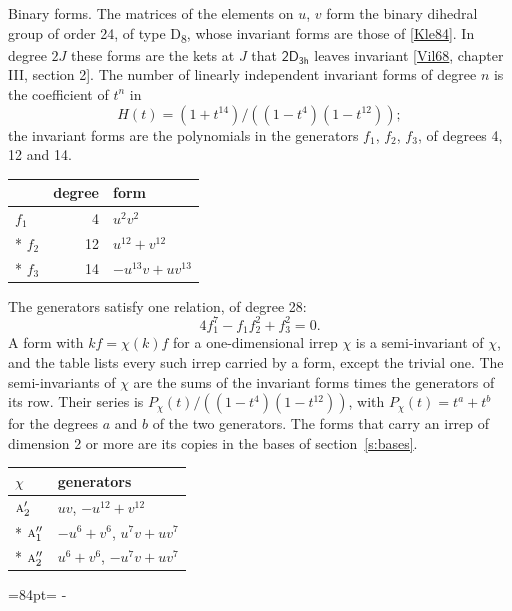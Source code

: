 \documentclass[10pt,a4paper]{article}
\makeatletter
\renewcommand\paragraph{\@startsection{paragraph}{4}{\z@}{1.5ex plus .5ex minus .2ex}{-1em}%
  {\normalfont\small\sffamily\bfseries\color{parttitle}}}
\newcommand{\needspace}[1]{\par\penalty-100\begingroup\dimen0=#1\relax\dimen2=\pagegoal
  \advance\dimen2-\pagetotal\ifdim\dimen0>\dimen2\relax\ifdim\dimen2>0pt\vfil\break\fi\fi
  \endgroup}
\numberwithin{equation}{section}
\newcommand{\grp}[1]{\mathsf{#1}}
\newcommand{\irr}[1]{\text{\normalfont\scshape #1}}
\makeatother
\begin{document}
\paragraph{Binary forms.}
The matrices of the elements on $u$, $v$ form the binary dihedral group of order 24, of type D\textsubscript{8}, whose invariant forms are those of [\href{../../../REFERENCES.pdf\#ref.Kle84}{Kle84}]. In degree $2J$ these forms are the kets at $J$ that $\grp{2D_{3h}}$ leaves invariant [\href{../../../REFERENCES.pdf\#ref.Vil68}{Vil68}, chapter III, section 2]. \label{n:head.degree}\label{n:head.form}The number of linearly independent invariant forms of degree $n$ is the coefficient of $t^n$ in
\begin{equation}\label{e:molien}H(t) = (1 + t^{14})/((1-t^{4})(1-t^{12}));\end{equation}
the invariant forms are the polynomials in the generators $f_1$, $f_2$, $f_3$, of degrees 4, 12 and 14.
{\small\begin{longtable}{@{}lrl@{}}\toprule
& degree & form\\\midrule\endhead
\bottomrule\endfoot\endlastfoot
$f_{1}$ & 4 & $u^{2}v^{2}$\\*
$f_{2}$ & 12 & $u^{12} + v^{12}$\\*
$f_{3}$ & 14 & $-u^{13}v + uv^{13}$\\
\bottomrule\end{longtable}}
The generators satisfy one relation, of degree 28:
\begin{equation}\label{e:relation}4f_{1}^{7} - f_{1}f_{2}^{2} + f_{3}^{2} = 0.\end{equation}
A form with $k f = \chi(k) f$ for a one-dimensional irrep $\chi$ is a semi-invariant of $\chi$, and the table lists every such irrep carried by a form, except the trivial one. \label{n:head.generators}The semi-invariants of $\chi$ are the sums of the invariant forms times the generators of its row. Their series is $P_\chi(t)/((1-t^{4})(1-t^{12}))$, with $P_\chi(t) = t^{a} + t^{b}$ for the degrees $a$ and $b$ of the two generators. The forms that carry an irrep of dimension 2 or more are its copies in the bases of section~\ref{s:bases}.
{\small\begin{longtable}{@{}ll@{}}\toprule
$\chi$ & generators\\\midrule\endhead
\bottomrule\endfoot\endlastfoot
$\irr{a}_{2}'$ & $uv$, $-u^{12} + v^{12}$\\*
$\irr{a}_{1}''$ & $-u^{6} + v^{6}$, $u^{7}v + uv^{7}$\\*
$\irr{a}_{2}''$ & $u^{6} + v^{6}$, $-u^{7}v + uv^{7}$\\
\bottomrule\end{longtable}}
\needspace{84pt}
\end{document}
